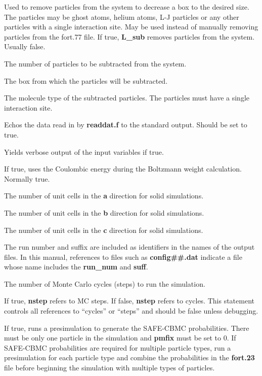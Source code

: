 \documentclass[12pt,letterpaper]{article}
\begin{document}
 Used to remove particles from the system to decrease a box to the desired size.
The particles may be ghost atoms, helium atoms, L-J particles or any other particles with a single interaction site.
May be used instead of manually removing particles from the fort.77 file.  If true, {\textbf{L\_sub}} removes particles
from the system.  Usually false.

 The number of particles to be subtracted from the system.

  The box from which the particles will be subtracted.

 The molecule type of the subtracted particles.
The particles must have a single interaction site.

 Echos the data read in by {\textbf {readdat.f}} to the
standard output. Should be set to true.

 Yields verbose output of the input variables if true.

 If true, uses the Coulombic energy during the Boltzmann weight calculation.
Normally true.

 The number of unit cells in the {\bf a} direction for solid simulations.

 The number of unit cells in the {\bf b} direction for solid simulations.

 The number of unit cells in the {\bf c} direction for solid simulations.

 The run number and suffix are included as identifiers in the names of the output files.
In this manual, references to files such as {\bf config\#\#.dat} indicate a file whose name includes the {\bf run\_num} and {\bf suff}.

 The number of Monte Carlo cycles (steps) to run the simulation.

 If true, {\textbf{nstep}} refers to MC steps.  If false, {\textbf{nstep}} refers to cycles.  
This statement controls all references to ``cycles'' or ``steps'' and should be false unless debugging.

 If true, runs a presimulation to generate the SAFE-CBMC probabilities.  
There must be only one particle in the simulation and {\textbf {pmfix}} must be set to 0.  If SAFE-CBMC
probabilities are required for multiple particle types, run a presimulation for each particle type and 
combine the probabilities in the {\textbf{fort.23}} file before beginning the simulation with multiple types of particles.
\end{document}
